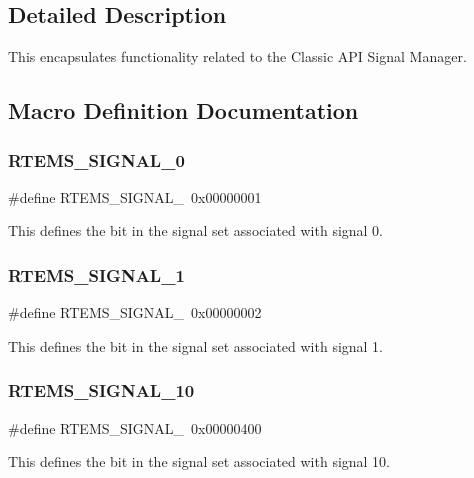\subsection{Detailed Description}
This encapsulates functionality related to the Classic A\+PI Signal Manager. 

\subsection{Macro Definition Documentation}
\mbox{\label{group__ClassicASR_gad28f0548e73227af9ed3c25e3c5d3284}} 
\subsubsection{\texorpdfstring{RTEMS\_SIGNAL\_0}{RTEMS\_SIGNAL\_0}}
{\footnotesize\ttfamily \#define R\+T\+E\+M\+S\+\_\+\+S\+I\+G\+N\+A\+L\+\_~0x00000001}

This defines the bit in the signal set associated with signal 0. \mbox{\label{group__ClassicASR_ga2a8b0e51f88afe662b0193ae25787a03}} 
\subsubsection{\texorpdfstring{RTEMS\_SIGNAL\_1}{RTEMS\_SIGNAL\_1}}
{\footnotesize\ttfamily \#define R\+T\+E\+M\+S\+\_\+\+S\+I\+G\+N\+A\+L\+\_~0x00000002}

This defines the bit in the signal set associated with signal 1. \mbox{\label{group__ClassicASR_ga57bd58b5327c26100257d3f93a893901}} 
\subsubsection{\texorpdfstring{RTEMS\_SIGNAL\_10}{RTEMS\_SIGNAL\_10}}
{\footnotesize\ttfamily \#define R\+T\+E\+M\+S\+\_\+\+S\+I\+G\+N\+A\+L\+\_~0x00000400}

This defines the bit in the signal set associated with signal 10. \mbox{\label{group__ClassicASR_gaec3c3e01724569f15a735c5ffab751b2}} 
